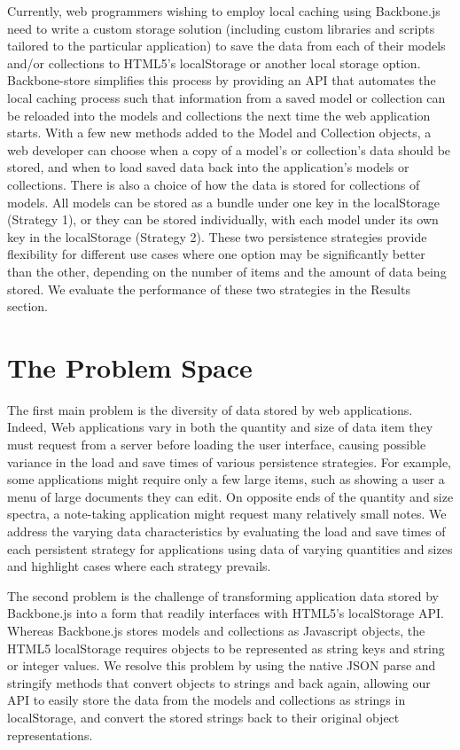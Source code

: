 \documentclass[12pt]{article}
\begin{document}
Currently, web programmers wishing to employ local caching using Backbone.js need to write a custom storage solution (including custom libraries and scripts tailored to the particular application) to save the data from each of their models and/or collections to HTML5's localStorage or another local storage option. Backbone-store simplifies this process by providing an API that automates the local caching process such that information from a saved model or collection can be reloaded into the
models and collections the next time the web application starts. With a few new
methods added to the Model and Collection objects, a web developer can choose
when a copy of a model's or collection's data should be stored, and when to
load saved data back into the application's models or collections. There is
also a choice of how the data is stored for collections of models. All models
can be stored as a bundle under one key in the localStorage (Strategy 1), or they can be
stored individually, with each model under its own key in the localStorage (Strategy 2).
These two persistence strategies provide flexibility for different use cases where one option may be
significantly better than the other, depending on the number of items and
the amount of data being stored. We evaluate the performance of these two strategies in the Results section.

\section{The Problem Space}

The first main problem is the diversity of data stored by web applications. Indeed, Web applications vary in both the quantity and size of data item they must request from a
server before loading the user interface, causing possible variance in the load and save times of various persistence strategies.  For example, some applications might require only a few
large items, such as showing a user a menu of large documents they can edit. On
opposite ends of the quantity and size spectra, a note-taking application might request many
relatively small notes. We address the varying data characteristics by evaluating the load and save times of each persistent strategy for applications using data of varying quantities and sizes and highlight cases where each strategy prevails.

The second problem is the challenge of transforming application data stored by Backbone.js into a form that readily interfaces with HTML5's localStorage API. Whereas Backbone.js stores models and collections as Javascript objects, the HTML5 localStorage requires objects to be represented as string keys and string or integer values. We resolve this problem by using the native JSON parse and stringify methods that convert objects to strings and back again, allowing our API to easily
store the data from the models and collections as strings in localStorage, and
convert the stored strings back to their original object representations.
\end{document}
